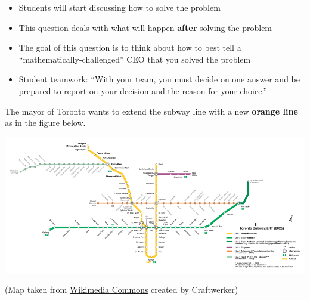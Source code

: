 \begin{annotation}
	\begin{notes}
		
		\begin{itemize}
			\item Students will start discussing how to solve the problem
			\item This question deals with what will happen \textbf{after} solving the problem
			\item The goal of this question is to think about how to best tell a ``mathematically-challenged'' CEO that you solved the problem
			\item Student teamwork: ``With your team, you must decide on one answer and be prepared to report on your decision and the reason for your choice.''
		\end{itemize}
	\end{notes}
\end{annotation}

\bookonlynewpage








\question 

The mayor of Toronto wants to extend the subway line with a new \textbf{\color{orange}orange line} as in the figure below. \label{p:TTC}
	

\begin{center}
	\includegraphics*[width=500pt]{images/TTC.png}
\end{center}
\begin{minipage}{1.1\textwidth}
\hfill {\footnotesize (Map taken from \href{https://uoft.me/modelling-TTC}{Wikimedia Commons} created by Craftwerker) \qquad {}}
\end{minipage}
	
